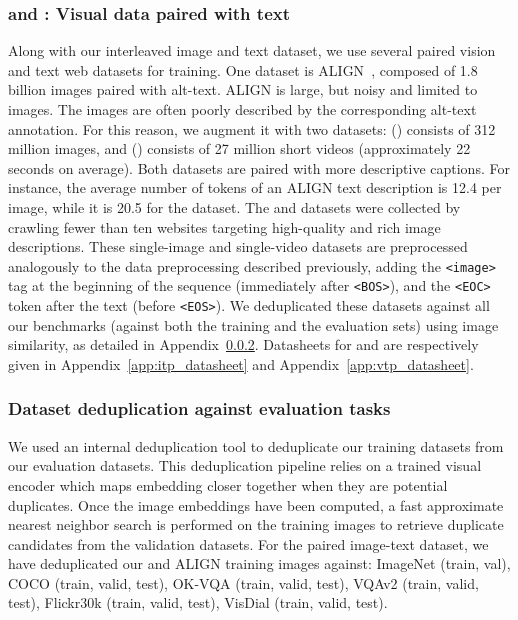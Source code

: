 \subsubsection{\shortimagetextpairs{} and \shortvideotextpairs{}: Visual data paired with text}
\label{app:vtp_and_itp}

Along with our interleaved image and text dataset, we use several paired vision and text web datasets for training.
One dataset is ALIGN~\citep{align}, composed of 1.8 billion images paired with alt-text.
ALIGN is large, but noisy and limited to images.
The images are often poorly described by the corresponding alt-text annotation.
For this reason, we augment it with two datasets: \shortimagetextpairs{} (\imagetextpairs) consists of 312 million images, and \shortvideotextpairs{} (\videotextpairs) consists of 27 million short videos (approximately 22 seconds on average). Both datasets are paired with more descriptive captions.
For instance, the average number of tokens of an ALIGN text description is 12.4 per image, while it is 20.5 for the \shortimagetextpairs{} dataset.
The \shortimagetextpairs{} and \shortvideotextpairs{} datasets were collected by crawling fewer than ten websites targeting high-quality and rich image descriptions.
These single-image and single-video datasets are preprocessed analogously to the \mmmw{} data preprocessing described previously, adding the \texttt{<image>} tag at the beginning of the sequence (immediately after \texttt{<BOS>}), and the \texttt{<EOC>} token after the text (before \texttt{<EOS>}).
We deduplicated these datasets against all our benchmarks (against both the training and the evaluation sets) using image similarity, as detailed in Appendix~\ref{app:dataset_dedup}.
Datasheets for \shortimagetextpairs{} and \shortvideotextpairs{} are respectively given in Appendix~\ref{app:itp_datasheet} and Appendix~\ref{app:vtp_datasheet}.

\subsubsection{Dataset deduplication against evaluation tasks}
\label{app:dataset_dedup}

We used an internal deduplication tool to deduplicate our training datasets from our evaluation datasets.
This deduplication pipeline relies on a trained visual encoder which maps embedding closer together when they are potential duplicates.
Once the image embeddings have been computed, a fast approximate nearest neighbor search is performed on the training images to retrieve duplicate candidates from the validation datasets.
For the paired image-text dataset, we have deduplicated our \shortimagetextpairs{} and ALIGN training images against: ImageNet (train, val), COCO (train, valid, test), OK-VQA (train, valid, test), VQAv2 (train, valid, test), Flickr30k (train, valid, test), VisDial (train, valid, test).

